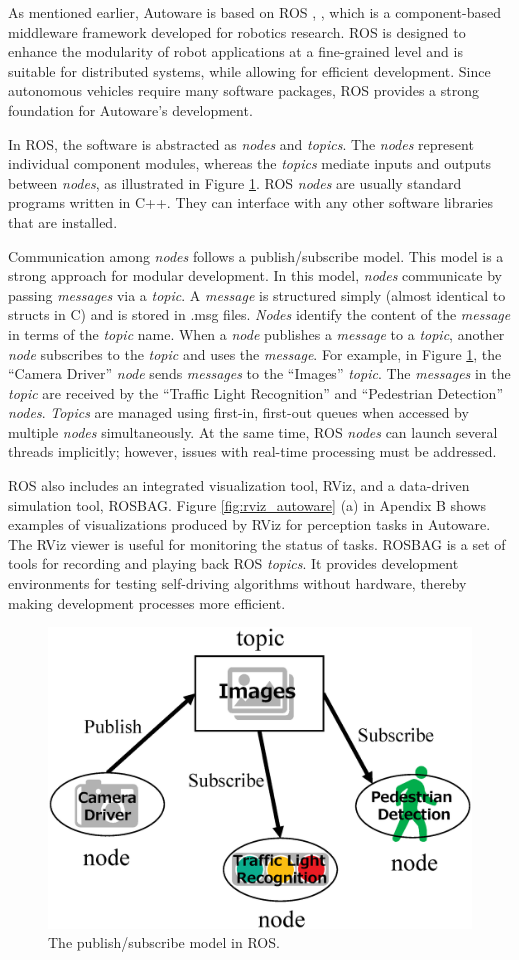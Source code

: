 As mentioned earlier, Autoware is based on ROS \cite{quigley2009ros},
\cite{rosorg}, which is a component-based middleware framework developed
for robotics research.
ROS is designed to enhance the modularity of robot applications at a
fine-grained level and is suitable for distributed systems, while
allowing for efficient development.
Since autonomous vehicles require many software packages, ROS provides a
strong foundation for Autoware's development.

In ROS, the software is abstracted as \emph{nodes} and \emph{topics}.
The \emph{nodes} represent individual component modules, whereas the \emph{topics} mediate inputs and outputs between \emph{nodes}, as illustrated in Figure \ref{fig:ros_pubsub}.
ROS \emph{nodes} are usually standard programs written in C++.
They can interface with any other software libraries that are installed.

Communication among \emph{nodes} follows a publish/subscribe model.
This model is a strong approach for modular development.
In this model, \emph{nodes} communicate by passing \emph{messages} via a \emph{topic}. 
A \emph{message} is structured simply (almost identical to structs in C) and is stored in .msg files.
\emph{Nodes} identify the content of the \emph{message} in terms of the \emph{topic} name.
When a \emph{node} publishes a \emph{message} to a \emph{topic}, another \emph{node} subscribes to the \emph{topic} and uses the \emph{message}. 
For example, in Figure \ref{fig:ros_pubsub}, the ``Camera Driver'' \emph{node} sends \emph{messages} to the ``Images'' \emph{topic}. 
The \emph{messages} in the \emph{topic} are received by the ``Traffic Light Recognition'' and ``Pedestrian Detection'' \emph{nodes}.
\emph{Topics} are managed using first-in, first-out queues when accessed by multiple \emph{nodes} simultaneously.
At the same time, ROS \emph{nodes} can launch several threads implicitly; however,
issues with real-time processing must be addressed.

ROS also includes an integrated visualization tool, RViz, and a
data-driven simulation tool, ROSBAG. 
Figure \ref{fig:rviz_autoware} (a) in Apendix B shows examples of visualizations produced by RViz for perception tasks in Autoware.
The RViz viewer is useful for monitoring the status of tasks.
ROSBAG is a set of tools for recording and playing back ROS \emph{topics}.
It provides development environments for testing self-driving algorithms without hardware, thereby making development processes more efficient.

\begin{figure}[!htbp]
  \centering
  \includegraphics[width=0.8\linewidth]{../figure/ros_pubsub.eps}
  \caption{\label{fig:ros_pubsub}
 The publish/subscribe model in ROS.}
\end{figure}

